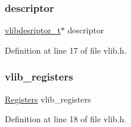 \subsubsection{\texorpdfstring{descriptor}{descriptor}}
{\footnotesize\ttfamily \hyperlink{a00158_a2d9000b4fbb25c5ed2950a2d8f4921d5_a2d9000b4fbb25c5ed2950a2d8f4921d5}{vlibdesriptor\+\_\+t}$\ast$ descriptor}



Definition at line 17 of file vlib.\+h.

\mbox{\label{a00158_ae94a2076c3fb43c35d18daf9cf664e23_ae94a2076c3fb43c35d18daf9cf664e23}} 
\subsubsection{\texorpdfstring{vlib\+\_\+registers}{vlib\_registers}}
{\footnotesize\ttfamily \hyperlink{a00218}{Registers} vlib\+\_\+registers}



Definition at line 18 of file vlib.\+h.

